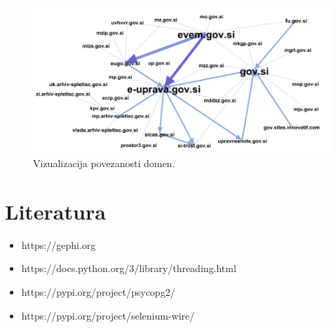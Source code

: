 \documentclass[a4paper,10pt]{paper}
\begin{document}
\begin{figure}[H]
\hspace*{-1cm}\includegraphics[width=14cm]{graf.png}
\centering

\caption{Vizualizacija povezanosti domen.}
\label{vv}
\end{figure}


\section{Literatura}
\begin{itemize}
  \item https://gephi.org
  \item https://docs.python.org/3/library/threading.html
  \item https://pypi.org/project/psycopg2/
  \item https://pypi.org/project/selenium-wire/
\end{itemize}
\end{document}
